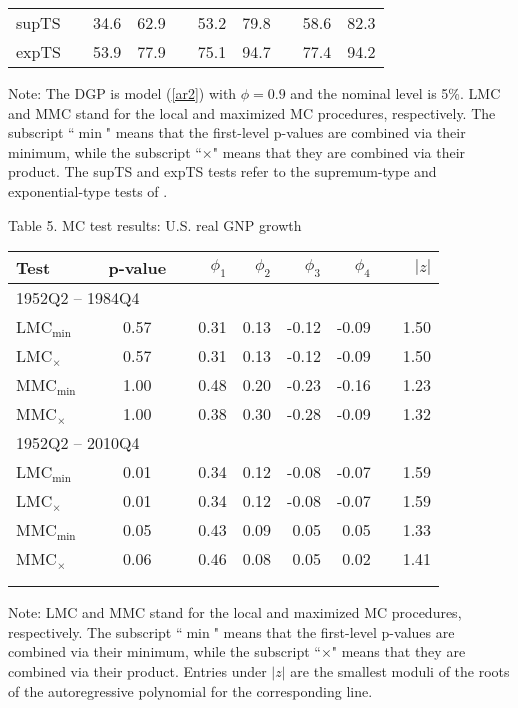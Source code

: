 \documentclass[11pt]{article}
\begin{document}
\begin{table}[p]
\begin{center}
\begin{tabular}{lrrrrrrrrr}
supTS &  & 34.6 & 62.9 &  & 53.2 & 79.8 &  & 58.6 & 82.3 \\ 
expTS &  & 53.9 & 77.9 &  & 75.1 & 94.7 &  & 77.4 & 94.2 \\ \hline\hline
\end{tabular}%
\end{center}
\par
Note: The DGP is model (\ref{ar2}) with $\phi=0.9$ and the nominal level is
5\%. LMC and MMC stand for the local and maximized MC procedures,
respectively. The subscript ``$\min$" means that the first-level p-values
are combined via their minimum, while the subscript ``$\times$" means that
they are combined via their product. The supTS and expTS tests refer to the
supremum-type and exponential-type tests of %
\citet{Carrasco-Hu-Ploberger:2014}.
\end{table}

\begin{table}[p]
\begin{center}
Table 5. MC test results: U.S. real GNP growth \medskip
\par
\begin{tabular}{lrccrrrrcr}
\hline\hline
Test &  & p-value &  & $\phi_1$ & $\phi_2$ & $\phi_3$ & $\phi_4$ &  & $|z|$
\\ \hline
\multicolumn{10}{l}{1952Q2 -- 1984Q4} \\ 
LMC$_{\min}$ &  & 0.57 &  & 0.31 & 0.13 & -0.12 & -0.09 &  & 1.50 \\ 
LMC$_{\times}$ &  & 0.57 &  & 0.31 & 0.13 & -0.12 & -0.09 &  & 1.50 \\ 
MMC$_{\min}$ &  & 1.00 &  & 0.48 & 0.20 & -0.23 & -0.16 &  & 1.23 \\ 
MMC$_{\times}$ &  & 1.00 &  & 0.38 & 0.30 & -0.28 & -0.09 &  & 1.32 \\ 
\multicolumn{10}{l}{1952Q2 -- 2010Q4} \\ 
LMC$_{\min}$ &  & 0.01 &  & 0.34 & 0.12 & -0.08 & -0.07 &  & 1.59 \\ 
LMC$_{\times}$ &  & 0.01 &  & 0.34 & 0.12 & -0.08 & -0.07 &  & 1.59 \\ 
MMC$_{\min}$ &  & 0.05 &  & 0.43 & 0.09 & 0.05 & 0.05 &  & 1.33 \\ 
MMC$_{\times}$ &  & 0.06 &  & 0.46 & 0.08 & 0.05 & 0.02 &  & 1.41 \\ 
\hline\hline
&  &  &  &  &  &  &  &  &  \\[-2.0ex] 
&  &  &  &  &  &  &  &  & 
\end{tabular}%
\end{center}
\par
Note: LMC and MMC stand for the local and maximized MC procedures,
respectively. The subscript ``$\min$" means that the first-level p-values
are combined via their minimum, while the subscript ``$\times$" means that
they are combined via their product. Entries under $|z|$ are the smallest
moduli of the roots of the autoregressive polynomial for the corresponding
line.
\end{table}
\end{document}
